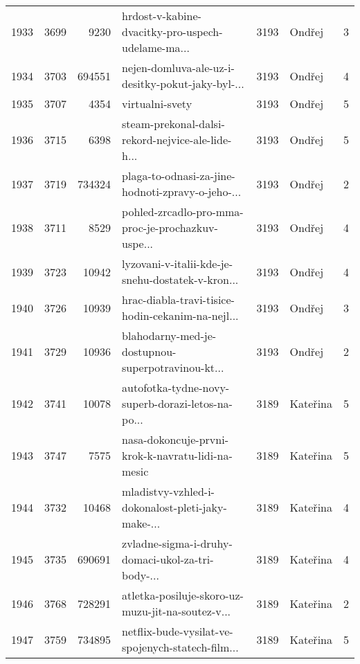 \begin{tabular}{lrrlrlr}
1933 &       3699 &     9230 &  hrdost-v-kabine-dvacitky-pro-uspech-udelame-ma... &     3193 &                       Ondřej &               3 \\
1934 &       3703 &   694551 &  nejen-domluva-ale-uz-i-desitky-pokut-jaky-byl-... &     3193 &                       Ondřej &               4 \\
1935 &       3707 &     4354 &                                    virtualni-svety &     3193 &                       Ondřej &               5 \\
1936 &       3715 &     6398 &  steam-prekonal-dalsi-rekord-nejvice-ale-lide-h... &     3193 &                       Ondřej &               5 \\
1937 &       3719 &   734324 &  plaga-to-odnasi-za-jine-hodnoti-zpravy-o-jeho-... &     3193 &                       Ondřej &               2 \\
1938 &       3711 &     8529 &  pohled-zrcadlo-pro-mma-proc-je-prochazkuv-uspe... &     3193 &                       Ondřej &               4 \\
1939 &       3723 &    10942 &  lyzovani-v-italii-kde-je-snehu-dostatek-v-kron... &     3193 &                       Ondřej &               4 \\
1940 &       3726 &    10939 &  hrac-diabla-travi-tisice-hodin-cekanim-na-nejl... &     3193 &                       Ondřej &               3 \\
1941 &       3729 &    10936 &  blahodarny-med-je-dostupnou-superpotravinou-kt... &     3193 &                       Ondřej &               2 \\
1942 &       3741 &    10078 &  autofotka-tydne-novy-superb-dorazi-letos-na-po... &     3189 &                     Kateřina &               5 \\
1943 &       3747 &     7575 &  nasa-dokoncuje-prvni-krok-k-navratu-lidi-na-mesic &     3189 &                     Kateřina &               5 \\
1944 &       3732 &    10468 &  mladistvy-vzhled-i-dokonalost-pleti-jaky-make-... &     3189 &                     Kateřina &               4 \\
1945 &       3735 &   690691 &  zvladne-sigma-i-druhy-domaci-ukol-za-tri-body-... &     3189 &                     Kateřina &               4 \\
1946 &       3768 &   728291 &  atletka-posiluje-skoro-uz-muzu-jit-na-soutez-v... &     3189 &                     Kateřina &               2 \\
1947 &       3759 &   734895 &  netflix-bude-vysilat-ve-spojenych-statech-film... &     3189 &                     Kateřina &               5 \\

\end{tabular}
